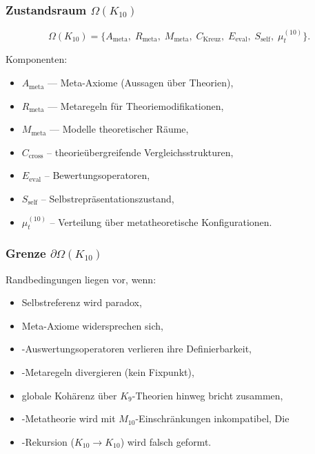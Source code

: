 \subsubsection{Zustandsraum $\Omega(K_{10})$}

\[
\Omega(K_{10})=
\{
A_{\mathrm{meta}},\;
R_{\mathrm{meta}},\;
M_{\mathrm{meta}},\;
C_{\mathrm{Kreuz}},\;
E_{\mathrm{eval}},\;
S_{\mathrm{self}},\;
\mu^{(10)}_t
\}.
\]

Komponenten:
\begin{itemize}
    \item $A_{\mathrm{meta}}$ — Meta-Axiome (Aussagen über Theorien),
    \item $R_{\mathrm{meta}}$ — Metaregeln für Theoriemodifikationen,
    \item $M_{\mathrm{meta}}$ — Modelle theoretischer Räume,
    \item $C_{\mathrm{cross}}$ – theorieübergreifende Vergleichsstrukturen,
    \item $E_{\mathrm{eval}}$ – Bewertungsoperatoren,
    \item $S_{\mathrm{self}}$ – Selbstrepräsentationszustand,
    \item $\mu^{(10)}_t$ – Verteilung über metatheoretische Konfigurationen.
\end{itemize}

\subsubsection{Grenze $\partial\Omega(K_{10})$}

Randbedingungen liegen vor, wenn:
\begin{itemize}
    \item Selbstreferenz wird paradox,
    \item Meta-Axiome widersprechen sich,
    \item-Auswertungsoperatoren verlieren ihre Definierbarkeit,
    \item-Metaregeln divergieren (kein Fixpunkt),
    \item globale Kohärenz über $K_9$-Theorien hinweg bricht zusammen,
    \item-Metatheorie wird mit $M_{10}$-Einschränkungen inkompatibel,
    Die \item-Rekursion ($K_{10}\to K_{10}$) wird falsch geformt.
\end{itemize}

